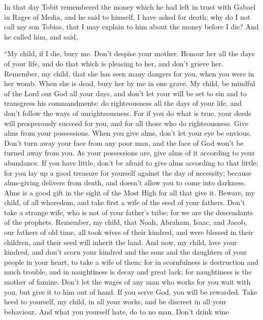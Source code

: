 In that day Tobit remembered the money which he had left in
trust with Gabael in Rages of Media,  and he said to
himself, I have asked for death; why do I not call my son Tobias, that I
may explain to him about the money before I die?  And he
called him, and said,

``My child, if I die, bury me. Don't despise your mother. Honour her all
the days of your life, and do that which is pleasing to her, and don't
grieve her.  Remember, my child, that she has seen many
dangers for you, when you were in her womb. When she is dead, bury her
by me in one grave.  My child, be mindful of the Lord our
God all your days, and don't let your will be set to sin and to
transgress his commandments: do righteousness all the days of your life,
and don't follow the ways of unrighteousness.  For if you do
what is true, your deeds will prosperously succeed for you, and for all
those who do righteousness.  Give alms from your
possessions. When you give alms, don't let your eye be envious. Don't
turn away your face from any poor man, and the face of God won't be
turned away from you.  As your possessions are, give alms of
it according to your abundance. If you have little, don't be afraid to
give alms according to that little;  for you lay up a good
treasure for yourself against the day of necessity; 
because alms-giving delivers from death, and doesn't allow you to come
into darkness.  Alms is a good gift in the sight of the
Most High for all that give it.  Beware, my child, of all
whoredom, and take first a wife of the seed of your fathers. Don't take
a strange wife, who is not of your father's tribe; for we are the
descendants of the prophets. Remember, my child, that Noah, Abraham,
Isaac, and Jacob, our fathers of old time, all took wives of their
kindred, and were blessed in their children, and their seed will inherit
the land.  And now, my child, love your kindred, and don't
scorn your kindred and the sons and the daughters of your people in your
heart, to take a wife of them; for in scornfulness is destruction and
much trouble, and in naughtiness is decay and great lack; for
naughtiness is the mother of famine.  Don't let the wages
of any man who works for you wait with you, but give it to him out of
hand. If you serve God, you will be rewarded. Take heed to yourself, my
child, in all your works, and be discreet in all your behaviour.
 And what you yourself hate, do to no man. Don't drink wine
